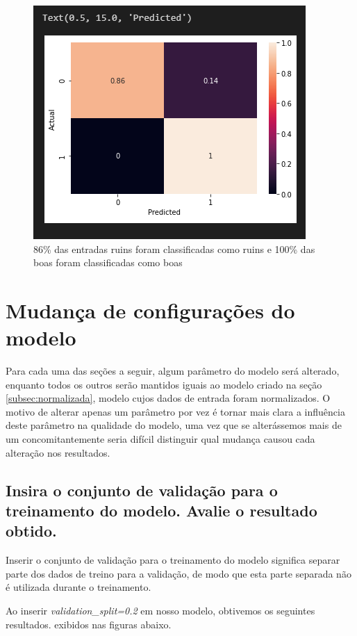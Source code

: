 \documentclass[12pt]{article}
\begin{document}
\begin{figure}[H]
	\centering
	\includegraphics[width=0.7\linewidth]{Imagens/ConfusionMatrizNormalizado}
	\caption{86\% das entradas ruins foram classificadas como ruins e 100\% das boas foram classificadas como boas}
	\label{fig:confusionmatriznormalizado}
\end{figure}

 
\section{Mudança de configurações do modelo}

Para cada uma das seções a seguir, algum parâmetro do modelo será alterado, enquanto todos os outros serão mantidos iguais ao modelo criado na seção \ref{subsec:normalizada}, modelo cujos dados de entrada foram normalizados. O motivo de alterar apenas um parâmetro por vez é tornar mais clara a influência deste parâmetro na qualidade do modelo, uma vez que se alterássemos mais de um concomitantemente seria difícil distinguir qual mudança causou cada alteração nos resultados.

\subsection{Insira o conjunto de validação para o treinamento do modelo. Avalie o resultado obtido.}

Inserir o conjunto de validação para o treinamento do modelo significa separar parte dos dados de treino para a validação, de modo que esta parte separada não é utilizada durante o treinamento.

Ao inserir \textit{validation\_split=0.2} em nosso modelo, obtivemos os seguintes resultados. exibidos nas figuras abaixo.
\end{document}
